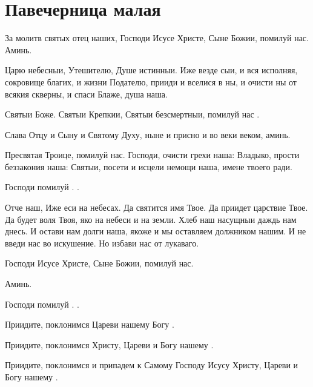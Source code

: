 \section{Павечерница малая}\begin{mymulticols}





За молитв святых отец наших, Господи Исусе Христе, Сыне Божии, помилуй нас. Аминь.

Царю небесныи, Утешителю, Душе истинныи. Иже везде сыи, и вся исполняя, сокровище благих, и жизни Подателю, прииди и вселися в ны, и очисти ны от всякия скверны, и спаси Блаже, душа наша.

Святыи Боже. Святыи Крепкии, Святыи безсмертныи, помилуй нас .

Слава Отцу и Сыну и Святому Духу, ныне и присно и во веки веком, аминь.

Пресвятая Троице, помилуй нас. Господи, очисти грехи наша: Владыко, прости беззакония наша: Святыи, посети и исцели немощи наша, имене твоего ради. 

Господи помилуй . .

Отче наш, Иже еси на небесах. Да святится имя Твое. Да приидет царствие Твое. Да будет воля Твоя, яко на небеси и на земли. Хлеб наш насущныи даждь нам днесь. И остави нам долги наша, якоже и мы оставляем должником нашим. И не введи нас во искушение. Но избави нас от лукаваго.

Господи Исусе Христе, Сыне Божии, помилуй нас.

Аминь.

Господи помилуй . .

Приидите, поклонимся Цареви нашему Богу .

Приидите, поклонимся Христу, Цареви и Богу нашему .

Приидите, поклонимся и припадем к Самому Господу Исусу Христу, Цареви и Богу нашему .





\end{mymulticols}
